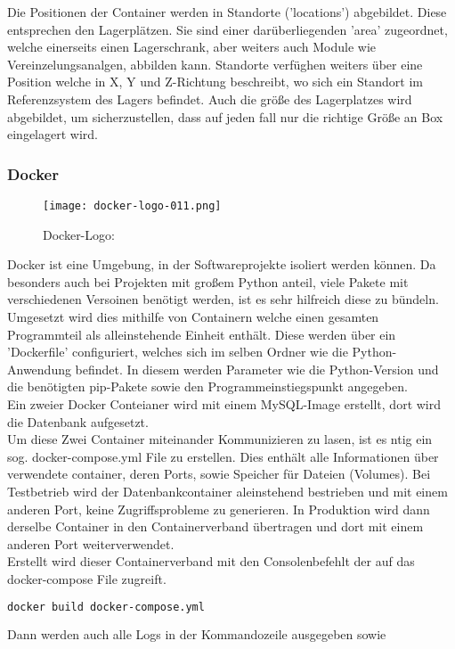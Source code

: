 Die Positionen der Container werden in Standorte ('locations') abgebildet. Diese entsprechen den Lagerplätzen. Sie sind einer darüberliegenden 'area' zugeordnet, welche einerseits einen Lagerschrank, aber weiters auch Module wie Vereinzelungsanalgen, abbilden kann. Standorte verfüghen weiters über eine Position welche in X, Y und Z-Richtung beschreibt, wo sich ein Standort im Referenzsystem des Lagers befindet. Auch die größe des Lagerplatzes wird abgebildet, um sicherzustellen, dass auf jeden fall nur die richtige Größe an Box eingelagert wird.


\subsubsection{Docker}

    \begin{wrapfigure}{r}{0.3\textwidth} %
        \vspace{-20px}
        \texttt{[image: docker-logo-011.png]} %
        \caption{Docker-Logo: \cite{docker_logo}}
    \end{wrapfigure}

    Docker ist eine Umgebung, in der Softwareprojekte isoliert werden können. Da besonders auch bei Projekten mit großem Python anteil, viele Pakete mit verschiedenen Versoinen benötigt werden, ist es sehr hilfreich diese zu bündeln. \\
    Umgesetzt wird dies mithilfe von Containern welche einen gesamten Programmteil als alleinstehende Einheit enthält. Diese werden über ein 'Dockerfile' configuriert, welches sich im selben Ordner wie die Python-Anwendung befindet. In diesem werden Parameter wie die Python-Version und die benötigten pip-Pakete sowie den Programmeinstiegspunkt angegeben. \\ 
    Ein zweier Docker Conteianer wird mit einem MySQL-Image erstellt, dort wird die Datenbank aufgesetzt. \\
    Um diese Zwei Container miteinander Kommunizieren zu lasen, ist es ntig ein sog. docker-compose.yml File zu erstellen. Dies enthält alle Informationen über verwendete container, deren Ports, sowie Speicher für Dateien (Volumes). Bei Testbetrieb wird der Datenbankcontainer aleinstehend bestrieben und mit einem anderen Port, keine Zugriffsprobleme zu generieren. In Produktion wird dann derselbe Container in den Containerverband übertragen und dort mit einem anderen Port weiterverwendet. \\
    Erstellt wird dieser Containerverband mit den Consolenbefehlt der auf das docker-compose File zugreift. 
    \begin{lstlisting}[language=bash]
        docker build docker-compose.yml\end{lstlisting}
    Dann werden auch alle Logs in der Kommandozeile ausgegeben sowie 


